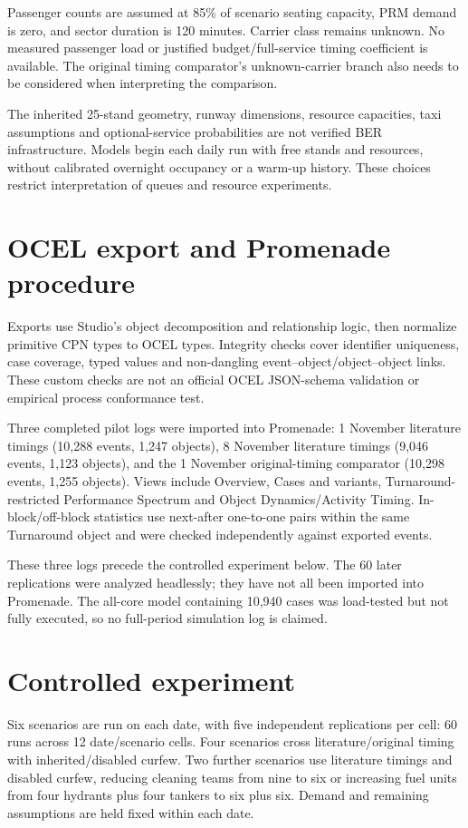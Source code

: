 Passenger counts are assumed at 85\% of scenario seating capacity, PRM demand is zero, and sector duration is 120 minutes. Carrier class remains unknown. No measured passenger load or justified budget/full-service timing coefficient is available. The original timing comparator's unknown-carrier branch also needs to be considered when interpreting the comparison.

The inherited 25-stand geometry, runway dimensions, resource capacities, taxi assumptions and optional-service probabilities are not verified BER infrastructure. Models begin each daily run with free stands and resources, without calibrated overnight occupancy or a warm-up history. These choices restrict interpretation of queues and resource experiments.

\section{OCEL export and Promenade procedure}
Exports use Studio's object decomposition and relationship logic, then normalize primitive CPN types to OCEL types. Integrity checks cover identifier uniqueness, case coverage, typed values and non-dangling event--object/object--object links. These custom checks are not an official OCEL JSON-schema validation or empirical process conformance test.

Three completed pilot logs were imported into Promenade: 1 November literature timings (10,288 events, 1,247 objects), 8 November literature timings (9,046 events, 1,123 objects), and the 1 November original-timing comparator (10,298 events, 1,255 objects). Views include Overview, Cases and variants, Turnaround-restricted Performance Spectrum and Object Dynamics/Activity Timing. In-block/off-block statistics use next-after one-to-one pairs within the same Turnaround object and were checked independently against exported events.

These three logs precede the controlled experiment below. The 60 later replications were analyzed headlessly; they have not all been imported into Promenade. The all-core model containing 10,940 cases was load-tested but not fully executed, so no full-period simulation log is claimed.

\section{Controlled experiment}
Six scenarios are run on each date, with five independent replications per cell: 60 runs across 12 date/scenario cells. Four scenarios cross literature/original timing with inherited/disabled curfew. Two further scenarios use literature timings and disabled curfew, reducing cleaning teams from nine to six or increasing fuel units from four hydrants plus four tankers to six plus six. Demand and remaining assumptions are held fixed within each date.

